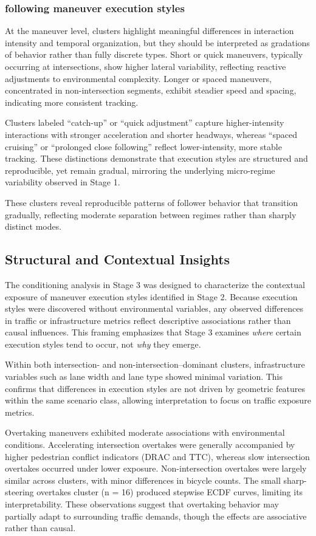 \subsubsection{following maneuver execution styles}
At the maneuver level, clusters highlight meaningful differences in interaction intensity and temporal organization, but they should be interpreted as gradations of behavior rather than fully discrete types. Short or quick maneuvers, typically occurring at intersections, show higher lateral variability, reflecting reactive adjustments to environmental complexity. Longer or spaced maneuvers, concentrated in non-intersection segments, exhibit steadier speed and spacing, indicating more consistent tracking.

Clusters labeled “catch-up” or “quick adjustment” capture higher-intensity interactions with stronger acceleration and shorter headways, whereas “spaced cruising” or “prolonged close following” reflect lower-intensity, more stable tracking. These distinctions demonstrate that execution styles are structured and reproducible, yet remain gradual, mirroring the underlying micro-regime variability observed in Stage 1.

These clusters reveal reproducible patterns of follower behavior that transition gradually, reflecting moderate separation between regimes rather than sharply distinct modes.


\subsection{Structural and Contextual Insights}

The conditioning analysis in Stage 3 was designed to characterize the contextual exposure of maneuver execution styles identified in Stage 2. Because execution styles were discovered without environmental variables, any observed differences in traffic or infrastructure metrics reflect descriptive associations rather than causal influences. This framing emphasizes that Stage 3 examines \textit{where} certain execution styles tend to occur, not \textit{why} they emerge.

Within both intersection- and non-intersection–dominant clusters, infrastructure variables such as lane width and lane type showed minimal variation. This confirms that differences in execution styles are not driven by geometric features within the same scenario class, allowing interpretation to focus on traffic exposure metrics.

Overtaking maneuvers exhibited moderate associations with environmental conditions. Accelerating intersection overtakes were generally accompanied by higher pedestrian conflict indicators (DRAC and TTC), whereas slow intersection overtakes occurred under lower exposure. Non-intersection overtakes were largely similar across clusters, with minor differences in bicycle counts. The small sharp-steering overtakes cluster (n = 16) produced stepwise ECDF curves, limiting its interpretability. These observations suggest that overtaking behavior may partially adapt to surrounding traffic demands, though the effects are associative rather than causal.

